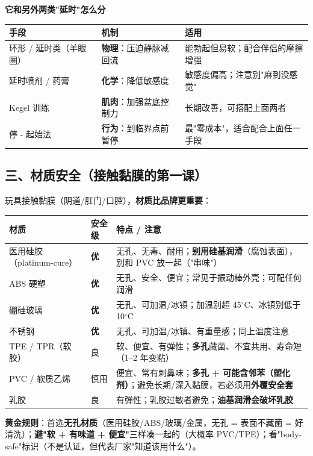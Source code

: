 \documentclass[12pt,UTF8,openany]{ctexbook}
\begin{document}
\textbf{它和另外两类"延时"怎么分}\\
\begin{tabularx}{\textwidth}{@{}l X X@{}}
\toprule
\textbf{手段} & \textbf{机制} & \textbf{适用} \\
\midrule
环形 / 延时类（羊眼圈） & \textbf{物理}：压迫静脉减回流 & 能勃起但易软；配合伴侣的摩擦增强 \\
\midrule
延时喷剂 / 药膏 & \textbf{化学}：降低敏感度 & 敏感度偏高；注意别"麻到没感觉" \\
\midrule
Kegel 训练 & \textbf{肌肉}：加强盆底控制力 & 长期改善，可搭配上面两者 \\
\midrule
停 - 起始法 & \textbf{行为}：到临界点前暂停 & 最"零成本"，适合配合上面任一手段 \\
\bottomrule
\end{tabularx}

\subsection*{三、材质安全（接触黏膜的第一课）}
玩具接触黏膜（阴道/肛门/口腔），\textbf{材质比品牌更重要}：
\begin{tabularx}{\textwidth}{X l X}
\toprule
\textbf{材质} & \textbf{安全级} & \textbf{特点 / 注意} \\
\midrule
医用硅胶（platinum-cure） & \textbf{优} & 无孔、无毒、耐用；\textbf{别用硅基润滑}（腐蚀表面），别和 PVC 放一起（"串味"） \\
ABS 硬塑 & \textbf{优} & 无孔、安全、便宜；常见于振动棒外壳；可配任何润滑 \\
硼硅玻璃 & \textbf{优} & 无孔、可加温/冰镇；加温别超 45$^\circ$C、冰镇别低于 10$^\circ$C \\
不锈钢 & \textbf{优} & 无孔、可加温/冰镇、有重量感；同上温度注意 \\
TPE / TPR（软胶） & 良 & 软、便宜、有弹性；\textbf{多孔}藏菌、不宜共用、寿命短（1--2 年变粘） \\
PVC / 软质乙烯 & 慎用 & 便宜、常有刺鼻味；\textbf{多孔 + 可能含邻苯（塑化剂）}；避免长期/深入黏膜，若必须用\textbf{外覆安全套} \\
乳胶 & 良 & 有弹性；乳胶过敏者避免；\textbf{油基润滑会破坏乳胶} \\
\bottomrule
\end{tabularx}
\par\smallskip
\textbf{黄金规则}：首选\textbf{无孔材质}（医用硅胶/ABS/玻璃/金属，无孔 = 表面不藏菌 = 好清洗）；\textbf{避"软 + 有味道 + 便宜"}三样凑一起的（大概率 PVC/TPE）；看"body-safe"标识（不是认证，但代表厂家"知道该用什么"）。
\end{document}
